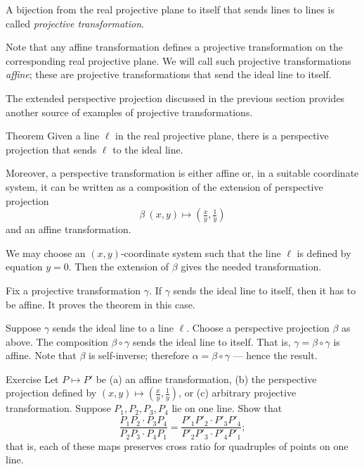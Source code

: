 A bijection from the real projective plane to itself 
that sends lines to lines 
is called \emph{projective transformation}.

Note that any affine transformation defines  a projective transformation on the corresponding real projective plane.
We will call such projective transformations \emph{affine}; 
these are projective transformations that send the ideal line to itself.

The extended perspective projection discussed in the previous section 
provides another source of examples of projective transformations.

\begin{thm}{Theorem}\label{thm:moving}
Given a line $\ell$ in the real projective plane, there is a perspective projection that sends $\ell$ to the ideal line.

Moreover, a perspective transformation is either affine or, in a suitable coordinate system, it can be written as a composition of the extension of perspective projection 
\[\beta\:(x,y)\mapsto (\tfrac xy,\tfrac 1y)\]
and an affine transformation.
\end{thm}

We may choose an $(x,y)$-coordinate system such that the line $\ell$ is defined by equation $y=0$.
Then the extension of $\beta$ gives the needed transformation.

Fix a projective transformation $\gamma$.
If $\gamma$ sends the ideal line to itself,
then it has to be affine. 
It proves the theorem in this case.

Suppose $\gamma$ sends the ideal line to a line $\ell$.
Choose a perspective projection $\beta$ as above.
The composition $\beta\circ\gamma$ sends the ideal line to itself.
That is, $\gamma=\beta\circ\gamma$ is affine.
Note that $\beta$ is self-inverse; therefore $\alpha=\beta\circ \gamma$ --- hence the result.
\qeds

\begin{thm}{Exercise}\label{ex:proj-cross-ratio}
Let $P\mapsto P'$ be (a) an affine transformation, (b) the perspective projection defined by $(x,y)\mapsto (\tfrac xy,\tfrac 1y)$, or (c) arbitrary projective transformation.
Suppose $P_1,P_2,P_3,P_4$ lie on one line.
Show that 
\[\frac{P_1P_2\cdot P_3P_4}{P_2P_3\cdot P_4P_1}=\frac{P'_1P'_2\cdot P'_3P'_4}{P'_2P'_3\cdot P'_4P'_1};\]
that is, each of these maps preserves cross ratio for quadruples of points on one line.

\end{thm}

